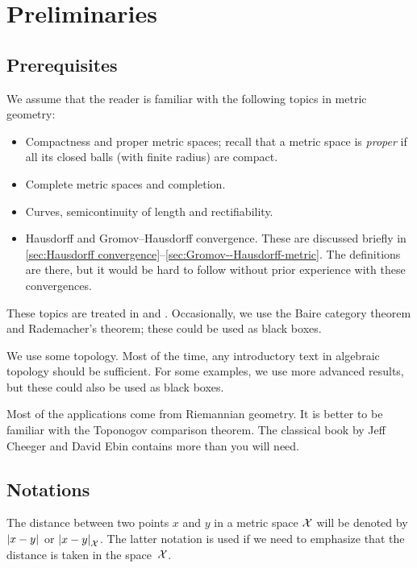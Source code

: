 
\mainmatter

\chapter{Preliminaries}\label{chap:prelim}

\section{Prerequisites}

We assume that the reader is familiar with the following topics in metric geometry:
\begin{itemize}
\item Compactness and proper metric spaces;
recall that a metric space is \emph{proper} if all its closed balls (with finite radius) are compact.
\item Complete metric spaces and completion.
\item Curves, semicontinuity of length and rectifiability.
\item Hausdorff and Gromov--Hausdorff convergence.
These are discussed briefly in \ref{sec:Hausdorff convergence}--\ref{sec:Gromov--Hausdorff-metric}.
The definitions are there, but it would be hard to follow without prior experience with these convergences.
\end{itemize}
These topics are treated in \cite{burago-burago-ivanov} and \cite{petrunin2023pure}.
Occasionally, we use the Baire category theorem and Rademacher's theorem; these could be used as black boxes.

We use some topology. 
Most of the time, any introductory text in algebraic topology should be sufficient.
For some examples, we use more advanced results, but these could also be used as black boxes.

Most of the applications come from Riemannian geometry.
It is better to be familiar with the Toponogov comparison theorem.
The classical book by Jeff Cheeger and David Ebin \cite{cheeger-ebin} contains more than you will need.

\section{Notations}

The distance between two points $x$ and $y$ in a metric space $\mathcal{X}$ will be denoted by $|{x}-{y}|_{}^{{}}$ or $|{x}-{y}|_{\mathcal{X}}^{{}}$.\label{page:|x-y|X}
The latter notation is used if we need to emphasize 
that the distance is taken in the space~${\mathcal{X}}$.

